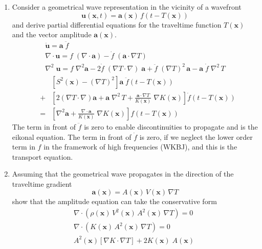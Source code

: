 \begin{enumerate}
\item Consider a geometrical wave representation in the vicinity of a wavefront
\begin{equation}
  {\mathbf{u}(\mathbf{x},t)} = \mathbf{a}(\mathbf{x})\,f\left(t-T(\mathbf{x})\right)
  \label{eq:gwave}
\end{equation}
and derive partial differential equations for the traveltime function
$T(\mathbf{x})$ and the vector amplitude $\mathbf{a}(\mathbf{x})$.
\begin{eqnarray}
\ddot{\mathbf{u}} = \mathbf{a}\;\ddot{f}\\
\nabla\cdot\mathbf{u} = f\;(\nabla\cdot\mathbf{a}) - \dot{f}\;(\mathbf{a}\cdot\nabla T)\\
\nabla^2\;\mathbf{u} = f\;\nabla^2\mathbf{a} - 2\dot{f}\;(\nabla T \cdot \nabla)\;\mathbf{a}
+ \ddot{f}\;(\nabla T)^2\,\mathbf{a} - \mathbf{a}\;\dot{f}\;\nabla^2\,T
\end{eqnarray}
\begin{eqnarray}
& & \left[S^2(\mathbf{x})-(\nabla T)^2\right]\mathbf{a}\;\ddot{f}(t-T(\mathbf{x})) \\
& + & \left[2(\nabla T \cdot \nabla)\mathbf{a}+\mathbf{a}\;\nabla^2\,T
+ \frac{\mathbf{a}\cdot\nabla T}{K(\mathbf{x})}\; \nabla K(\mathbf{x})\right]\dot{f}(t-T(\mathbf{x})) \\
& = & \left[\nabla^2\mathbf{a}+ \frac{\nabla\cdot \mathbf{a}}{K(\mathbf{x})}\; \nabla K(\mathbf{x})  \right]{f}(t-T(\mathbf{x}))
\end{eqnarray}
The term in front of $\ddot{f}$ is zero to enable discontinuities to propagate and is the eikonal equation.
The term in front of $\dot{f}$ is zero, if we neglect the lower order term in $f$ in the framework 
of high frequencies (WKBJ), and this is the transport equation.
%
\item Assuming that the geometrical wave propagates in the direction
  of the traveltime gradient
\begin{equation}
  {\mathbf{a}(\mathbf{x})} = A(\mathbf{x})\,V(\mathbf{x})\,\nabla T
  \label{eq:vamp}
\end{equation}
show that the amplitude equation can take the conservative form
\begin{eqnarray}
  \label{eq:cons}
  \nabla \cdot \left(\rho(\mathbf{x})\,V^2(\mathbf{x})\,A^2(\mathbf{x})\,\nabla T\right) = 0 \\
  \nabla \cdot \left(K(\mathbf{x})\,A^2(\mathbf{x})\,\nabla T\right) = 0\\
 A^2(\mathbf{x})\left[\nabla K \cdot \nabla T\right] + 2K(\mathbf{x})\;A(\mathbf{x})\;

\end{eqnarray}
\end{enumerate}
